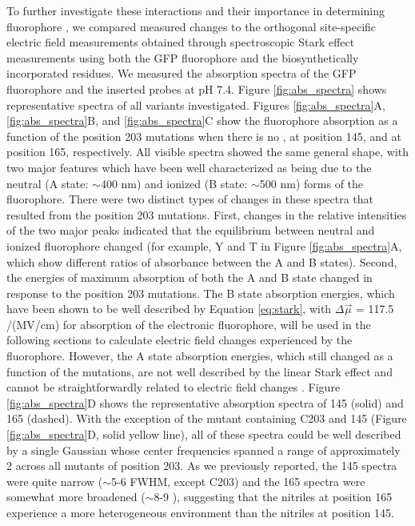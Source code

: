 To further investigate these interactions and their importance in determining fluorophore \pKa{}, we compared measured \pKa{} changes to the orthogonal site-specific electric field measurements obtained through spectroscopic Stark effect measurements using both the GFP fluorophore and the biosynthetically incorporated \pCNF{} residues.
We measured the absorption spectra of the GFP fluorophore and the inserted \pCNF{} probes at pH 7.4.
Figure \ref{fig:abs_spectra} shows representative spectra of all variants investigated.
Figures \ref{fig:abs_spectra}A, \ref{fig:abs_spectra}B, and \ref{fig:abs_spectra}C show the fluorophore absorption as a function of the position 203 mutations when there is no \pCNF{}, \pCNF{} at position 145, and \pCNF{} at position 165, respectively.
All visible spectra showed the same general shape, with two major features which have been well characterized as being due to the neutral (A state: $\sim$400 \si{\nm}) and ionized (B state: $\sim$500 \si{\nm}) forms of the fluorophore.
There were two distinct types of changes in these spectra that resulted from the position 203 mutations.
First, changes in the relative intensities of the two major peaks indicated that the equilibrium between neutral and ionized fluorophore changed (for example, Y and T in Figure \ref{fig:abs_spectra}A, which show different ratios of absorbance between the A and B states).
Second, the energies of maximum absorption of both the A and B state changed in response to the position 203 mutations.
The B state absorption energies, which have been shown to be well described by Equation \ref{eq:stark}, with $\Delta\vec{\mu}$ = 117.5 \si{\wn}/(MV/cm)\cite{Bublitz1998} for absorption of the electronic fluorophore, will be used in the following sections to calculate electric field changes experienced by the fluorophore.
However, the A state absorption energies, which still changed as a function of the mutations, are not well described by the linear Stark effect and cannot be straightforwardly related to electric field changes \cite{Bublitz1998}.
Figure \ref{fig:abs_spectra}D shows the representative \pCNF{} absorption spectra of \pCNF{} 145 (solid) and 165 (dashed).
With the exception of the mutant containing C203 and \pCNF{} 145 (Figure \ref{fig:abs_spectra}D, solid yellow line), all of these spectra could be well described by a single Gaussian whose center frequencies spanned a range of approximately 2 \si{\wn} across all mutants of position 203.
As we previously reported, the \pCNF{} 145 spectra were quite narrow ($\sim$5-6 \si{\wn} FWHM, except C203) and the \pCNF{} 165 spectra were somewhat more broadened ($\sim$8-9 \si{\wn}), suggesting that the nitriles at position 165 experience a more heterogeneous environment than the nitriles at position 145.
